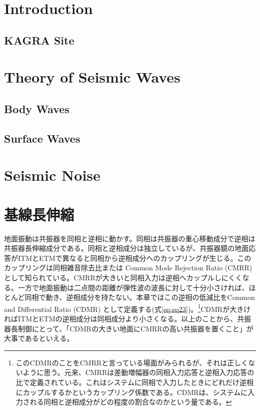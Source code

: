 \documentclass[a4paper,12pt]{book}
\begin{document}
\setcounter{tocdepth}{2}
\tableofcontents


\section{Introduction}
\subsection{KAGRA Site}
\section{Theory of Seismic Waves}
\subsection{Body Waves}
\subsection{Surface Waves}
\section{}
\section{Seismic Noise}

\section{基線長伸縮}
地面振動は共振器を同相と逆相に動かす。同相は共振器の重心移動成分で逆相は共振器長伸縮成分である。同相と逆相成分は独立しているが、共振器鏡の地面応答がITMとETMで異なると同相から逆相成分へのカップリングが生じる。このカップリングは同相雑音除去比または Common Mode Rejection Ratio (CMRR) として知られている。CMRRが大きいと同相入力は逆相へカップルしにくくなる。一方で地面振動は二点間の距離が弾性波の波長に対して十分小さければ、ほとんど同相で動き、逆相成分を持たない。本章ではこの逆相の低減比をCommon and Differential Ratio (CDMR) として定義する(式\ref{eq:eq23})。\footnote[3]{このCDMRのことをCMRRと言っている場面がみられるが、それは正しくないように思う。元来、CMRRは差動増幅器の同相入力応答と逆相入力応答の比で定義されている。これはシステムに同相で入力したときにどれだけ逆相にカップルするかというカップリング係数である。CDMRは、システムに入力される同相と逆相成分がどの程度の割合なのかという量である。}CDMRが大きければITMとETMの逆相成分は同相成分より小さくなる。以上のことから、共振器長制御にとって、「CDMRの大きい地面にCMRRの高い共振器を置くこと」が大事であるといえる。
\end{document}
